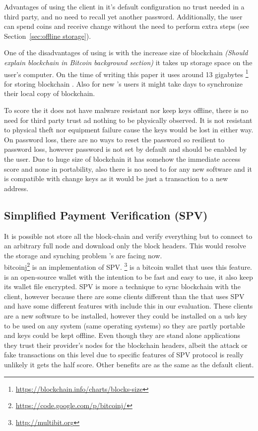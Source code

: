 Advantages of using the \bitcoinclient client in it's default configuration no trust needed in a third party, and no need to recall yet another password. Additionally, the user can spend coins and receive change without the need to perform extra steps (see Section~\ref{sec:offline storage}). 

One of the disadvantages of using \bitcoinclient is with the increase size of blockchain \textit {(Should explain blockchain in Bitcoin background section)}  it takes up storage space on the user's computer. On the time of writing this paper it uses around 13 gigabytes \footnote{\url{https://blockchain.info/charts/blocks-size}} for storing blockchain . Also for new \bitcoinclient's users it might take days to synchronize their local copy of blockchain.

To score the \bitcoinclient it does not have malware resistant nor keep keys offline, there is no need for third party trust ad nothing to be physically observed. It is not resistant to physical theft nor equipment failure cause the keys would be lost in either way. On password loss, there are no ways to reset the password so resilient to password loss, however password is not set by default and should be enabled by the user. Due to huge size of blockchain it has somehow the immediate access score and none in portability, also there is no need to for any new software and it is compatible with change keys as it would be just a transaction to a new address.
\subsection{Simplified Payment Verification (SPV)}
It is possible not store all the block-chain and verify everything but to connect to an arbitrary full node and download only the block headers. This would resolve the storage and synching problem \bitcoinclient's are facing now. \\
bitcoinj\footnote{\url {https://code.google.com/p/bitcoinj/}} is an implementation of SPV.
 \multibit \footnote{\url {http://multibit.org}} is a bitcoin wallet that uses this feature. \multibit is an open-source wallet with the intention to be fast and easy to use, it also keep its wallet file encrypted.
SPV is more a technique to sync blockchain with the client, however because there are some clients different than the \bitcoinclient that uses SPV and have some different features with include this in our evaluation.
These clients are a new software to be installed, however they could be installed on a usb key to be used on any system (same operating systems) so they are partly portable and keys could be kept offline. Even though they are stand alone applications they trust their provider's nodes for the blockchain headers, albeit the attack or fake transactions on this level due to specific features of SPV protocol is really unlikely it gets the half score. Other benefits are as the same as the default client.


